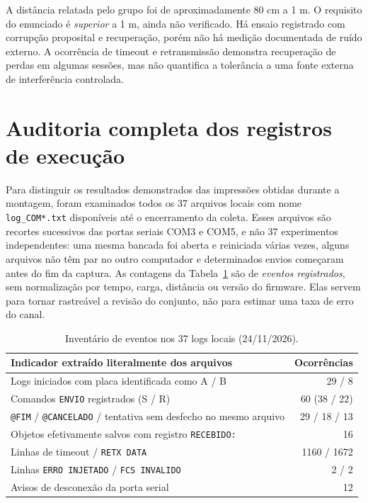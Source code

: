 \documentclass[12pt,a4paper]{article}
\begin{document}
A distância relatada pelo grupo foi de aproximadamente 80 cm a 1 m. O requisito do enunciado é \emph{superior} a 1 m, ainda não verificado. Há ensaio registrado com corrupção proposital e recuperação, porém não há medição documentada de ruído externo. A ocorrência de timeout e retransmissão demonstra recuperação de perdas em algumas sessões, mas não quantifica a tolerância a uma fonte externa de interferência controlada.

\section{Auditoria completa dos registros de execução}
\label{sec:auditoria}
Para distinguir os resultados demonstrados das impressões obtidas durante a montagem, foram examinados todos os 37 arquivos locais com nome \texttt{log\_COM*.txt} disponíveis até o encerramento da coleta. Esses arquivos são recortes sucessivos das portas seriais COM3 e COM5, e não 37 experimentos independentes: uma mesma bancada foi aberta e reiniciada várias vezes, alguns arquivos não têm par no outro computador e determinados envios começaram antes do fim da captura. As contagens da Tabela~\ref{tab:auditoria} são de \emph{eventos registrados}, sem normalização por tempo, carga, distância ou versão do firmware. Elas servem para tornar rastreável a revisão do conjunto, não para estimar uma taxa de erro do canal.

\begin{table}[h]
\centering
\caption{Inventário de eventos nos 37 logs locais (24/11/2026).}
\label{tab:auditoria}
\begin{tabular}{p{8cm}r}
\toprule
Indicador extraído literalmente dos arquivos & Ocorrências \\
\midrule
Logs iniciados com placa identificada como A / B & 29 / 8 \\
Comandos \texttt{ENVIO} registrados (S / R) & 60 (38 / 22) \\
\texttt{@FIM} / \texttt{@CANCELADO} / tentativa sem desfecho no mesmo arquivo & 29 / 18 / 13 \\
Objetos efetivamente salvos com registro \texttt{RECEBIDO:} & 16 \\
Linhas de timeout / \texttt{RETX DATA} & 1160 / 1672 \\
Linhas \texttt{ERRO INJETADO} / \texttt{FCS INVALIDO} & 2 / 2 \\
Avisos de desconexão da porta serial & 12 \\
\bottomrule
\end{tabular}
\end{table}
\end{document}
